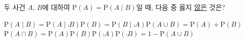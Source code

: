두 사건 $A$, $B$에 대하여 $\mathrm{P}(A)=\mathrm{P}(A\mid B)$일 때, 다음 중 옳지 \underline{않은} 것은? 
\begin{choicesii}{$\mathrm{P}(A\mid B)=\mathrm{P}(A\mid \comp{B})$}{$\mathrm{P}(B)=\mathrm{P}(B\mid \comp{A})$}{$\mathrm{P}(A\cup B)=\mathrm{P}(A)+\mathrm{P}(B)$}{$\mathrm{P}(A\cap B)=\mathrm{P}(A)\mathrm{P}(B)$}{$\mathrm{P}(\comp{A})\mathrm{P}(\comp{B})=1-\mathrm{P}(A\cup B)$}\end{choicesii}

